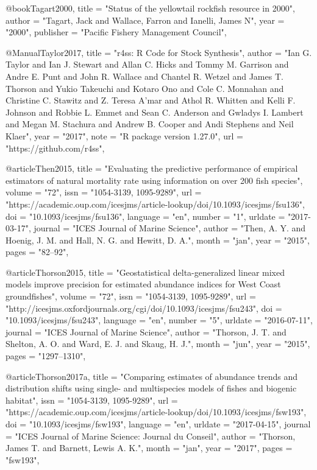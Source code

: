 {@book{Tagart2000,
    title = "{Status of the yellowtail rockfish resource in 2000}",
    author = "{Tagart, Jack and Wallace, Farron and Ianelli, James N}",
    year = "{2000}",
    publisher = "{Pacific Fishery Management Council}",
}

@Manual{Taylor2017,
    title = "{r4ss: R Code for Stock Synthesis}",
    author = "{Ian G. Taylor and Ian J. Stewart and Allan C. Hicks and Tommy M. Garrison and Andre E. Punt and John R. Wallace and Chantel R. Wetzel and James T. Thorson and Yukio Takeuchi and Kotaro Ono and Cole C. Monnahan and Christine C. Stawitz and Z. Teresa A'mar and Athol R. Whitten and Kelli F. Johnson and Robbie L. Emmet and Sean C. Anderson and Gwladys I. Lambert and Megan M. Stachura and Andrew B. Cooper and Andi Stephens and Neil Klaer}",
    year = "{2017}",
    note = "{R package version 1.27.0}",
    url = "{https://github.com/r4ss}",
}

@article{Then2015,
    title = "{Evaluating the predictive performance of empirical estimators of natural mortality rate using information on over 200 fish species}",
    volume = "{72}",
    issn = "{1054-3139, 1095-9289}",
    url = "{https://academic.oup.com/icesjms/article-lookup/doi/10.1093/icesjms/fsu136}",
    doi = "{10.1093/icesjms/fsu136}",
    language = "{en}",
    number = "{1}",
    urldate = "{2017-03-17}",
    journal = "{ICES Journal of Marine Science}",
    author = "{Then, A. Y. and Hoenig, J. M. and Hall, N. G. and Hewitt, D. A.}",
    month = "jan",
    year = "{2015}",
    pages = "{82--92}",
}

@article{Thorson2015,
    title = "{Geostatistical delta-generalized linear mixed models improve precision for estimated abundance indices for {West} {Coast} groundfishes}",
    volume = "{72}",
    issn = "{1054-3139, 1095-9289}",
    url = "{http://icesjms.oxfordjournals.org/cgi/doi/10.1093/icesjms/fsu243}",
    doi = "{10.1093/icesjms/fsu243}",
    language = "{en}",
    number = "{5}",
    urldate = "{2016-07-11}",
    journal = "{ICES Journal of Marine Science}",
    author = "{Thorson, J. T. and Shelton, A. O. and Ward, E. J. and Skaug, H. J.}",
    month = "jun",
    year = "{2015}",
    pages = "{1297--1310}",
}

@article{Thorson2017a,
    title = "{Comparing estimates of abundance trends and distribution shifts using single- and multispecies models of fishes and biogenic habitat}",
    issn = "{1054-3139, 1095-9289}",
    url = "{https://academic.oup.com/icesjms/article-lookup/doi/10.1093/icesjms/fsw193}",
    doi = "{10.1093/icesjms/fsw193}",
    language = "{en}",
    urldate = "{2017-04-15}",
    journal = "{ICES Journal of Marine Science: Journal du Conseil}",
    author = "{Thorson, James T. and Barnett, Lewis A. K.}",
    month = "jan",
    year = "{2017}",
    pages = "{fsw193}",
}

}
